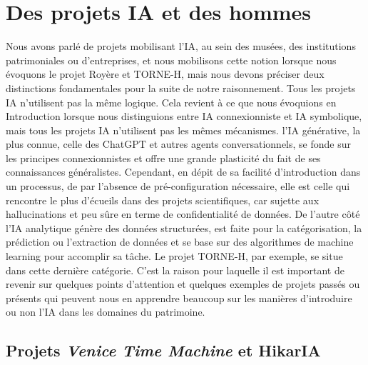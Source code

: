\section{Des projets IA et des hommes}

Nous avons parlé de projets mobilisant l'IA, au sein des musées, des institutions patrimoniales ou d'entreprises, et nous mobilisons cette notion lorsque nous évoquons le projet Royère et TORNE-H, mais nous devons préciser deux distinctions fondamentales pour la suite de notre raisonnement. Tous les projets IA n'utilisent pas la même logique. Cela revient à ce que nous évoquions en Introduction lorsque nous distinguions entre IA connexionniste et IA symbolique, mais tous les projets IA n'utilisent pas les mêmes mécanismes. l'IA générative, la plus connue, celle des ChatGPT et autres agents conversationnels, se fonde sur les principes connexionnistes et offre une grande plasticité du fait de ses connaissances généralistes. Cependant, en dépit de sa facilité d'introduction dans un processus, de par l'absence de pré-configuration nécessaire, elle est celle qui rencontre le plus d'écueils dans des projets scientifiques, car sujette aux hallucinations et peu sûre en terme de confidentialité de données. De l'autre côté l'IA analytique génère des données structurées, est faite pour la catégorisation, la prédiction ou l'extraction de données et se base sur des algorithmes de machine learning pour accomplir sa tâche. Le projet TORNE-H, par exemple, se situe dans cette dernière catégorie. C'est la raison pour laquelle il est important de revenir sur quelques points d'attention et quelques exemples de projets passés ou présents qui peuvent nous en apprendre beaucoup sur les manières d'introduire ou non l'IA dans les domaines du patrimoine.

\subsection{Projets \textit{Venice Time Machine} et HikarIA}

